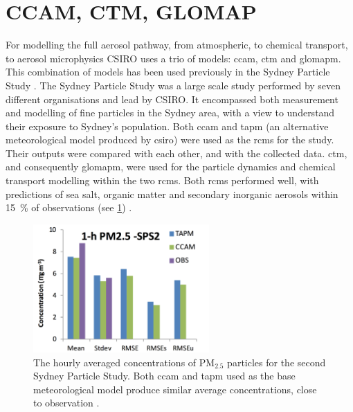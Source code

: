 

	\section{CCAM, CTM, GLOMAP}
	\label{sec:ccg}

	For modelling the full aerosol pathway, from atmospheric, to chemical transport, to aerosol microphysics CSIRO uses a trio of models: \gls{ccam}, \gls{ctm} and \gls{glomapm}. This combination of models has been used previously in the Sydney Particle Study \citep{cope:2014tw}. The Sydney Particle Study was a large scale study performed by seven different organisations and lead by CSIRO. It encompassed both measurement and modelling of fine particles in the Sydney area, with a view to understand their exposure to Sydney's population. Both \gls{ccam} and \gls{tapm} (an alternative meteorological model produced by \gls{csiro}) were used as the \gls{rcm}s for the study. Their outputs were compared with each other, and with the collected data. \gls{ctm}, and consequently \gls{glomapm}, were used for the particle dynamics and chemical transport modelling within the two \gls{rcm}s. Both \gls{rcm}s performed well, with predictions of sea salt, organic matter and secondary inorganic aerosols within \SI{15}{\percent} of observations (see \cref{fig:sydpartdata}) \citep{cope:2014tw}.

	\begin{figure}[!htb]
	    \centering
	    \includegraphics[width=0.6\textwidth,natwidth=1308,natheight=952]{Fig/Literature_Review/sydneyparticledata.png}
	    \caption{The hourly averaged concentrations of $\mathrm{PM}_{2.5}$ particles for the second Sydney Particle Study. Both \gls{ccam} and \gls{tapm} used as the base meteorological model produce similar average concentrations, close to observation \citep{cope:2014tw}.}
	    \label{fig:sydpartdata}
	\end{figure}
